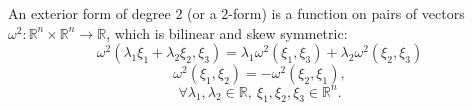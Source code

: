 An exterior form of degree $2$ (or a $2$-form) is a function on pairs of vectors $\omega^2: \mathbb{R}^n \times \mathbb{R}^n \to \mathbb{R}$, which is bilinear and skew symmetric:
$$\omega^2(\lambda_1 \xi_1 + \lambda_2 \xi_2, \xi_3) = \lambda_1 \omega^2(\xi_1, \xi_3) + \lambda_2 \omega^2(\xi_2, \xi_3)$$
$$\omega^2(\xi_1, \xi_2) = -\omega^2(\xi_2, \xi_1),$$
$$\forall \lambda_1, \lambda_2 \in \mathbb{R}, \ \xi_1, \xi_2, \xi_3 \in \mathbb{R}^n.$$
